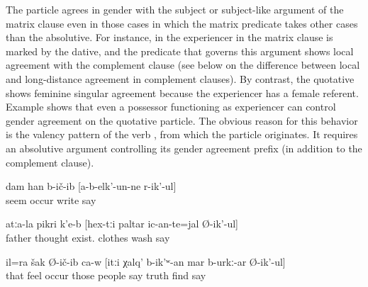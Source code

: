 The particle agrees in gender with the subject or subject-like argument of the matrix clause even in those cases in which the matrix predicate takes other cases than the absolutive. For instance, in  the experiencer in the matrix clause is marked by the dative, and the predicate that governs this argument shows local agreement with the complement clause (see  below on the difference between local and long-distance agreement in complement clauses). By contrast, the quotative shows feminine singular agreement because the experiencer has a female referent. Example  shows that even a possessor functioning as experiencer can control gender agreement on the quotative particle. The obvious reason for this behavior is the valency pattern of the verb  , from which the particle originates. It requires an absolutive argument controlling its gender agreement prefix (in addition to the complement clause).
%
\begin{exe}
	\ex	\label{ex:‎‎‎I thought that he did not write}
	\gll	dam	han	b-ič-ib	[a-b-elk'-un-ne	r-ik'-ul]\\
			seem	occur	write	say\\
	\glt	{}

	\ex	\label{ex:‎The father thinks about whether these clothes are to be washed.}
	\gll	atːa-la	pikri	k'e-b	[hex-tːi	paltar	ic-an-te=jal	Ø-ik'-ul]\\
		father	thought	exist.		clothes	wash	say\\
	\glt	{}

	\ex	\label{ex:He also guessed that the people had probably said the truth}
	\gll	il=ra	šak	Ø-ič-ib	ca-w	[itːi	χalq'	b-ik'ʷ-an	mar	b-urkː-ar	Ø-ik'-ul]\\
		that	feel	occur		those	people	say	truth	find	say\\
	\glt	{}
\end{exe}

